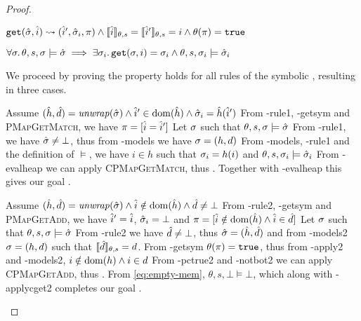 \begin{proof}


\pfassume \begin{hypvlist}
 $\texttt{get}(\hat{\sigma},\hat{i})\rightsquigarrow(\hat{i}', \hat{\sigma}_i, \pi) \land \llbracket\hat{i}\rrbracket_{\theta,s}=\llbracket\hat{i}'\rrbracket_{\theta,s}=i \land \theta(\pi)=\texttt{true} $
\end{hypvlist}
\pfprove \begin{goalvlist}
 $\forall \sigma\ldotp \theta,s,\sigma \models \hat{\sigma} \implies \exists \sigma_i \ldotp \texttt{get}(\sigma, i)=\sigma_i \land \theta,s,\sigma_i \models \hat{\sigma}_i$
\end{goalvlist}

We proceed by proving the property holds for all rules of the symbolic , resulting in three cases.


\begin{hypvlist}
 Assume $(\hat{h},\hat{d})={\operatorname{\mathit{unwrap}}}(\hat{\sigma}) \land \hat{i}'\in\operatorname{dom}(\hat{h}) \land \hat{\sigma}_i=\hat{h}(\hat{i}')$
 From \hyp{rule1}, \hyp{getsym} and \textsc{PMapGetMatch}, we have $\pi=[\hat{i}=\hat{i}']$
 Let $\sigma$ such that $\theta,s,\sigma\models\hat{\sigma}$
 From \hyp{rule1}, we have $\hat{\sigma}\neq\bot$, thus from \hyp{models} we have $\sigma=(h, d)$
 From \hyp{models}, \hyp{rule1} and the definition of $\models$, we have $i\in h$ such that $\sigma_i=h(i)$ and ${\theta,s,\sigma_i\models\hat{\sigma}_i}$
 From \hyp{evalheap} we can apply \textsc{CPMapGetMatch}, thus . Together with \hyp{evalheap} this gives our goal .
\end{hypvlist}


\begin{hypvlist}
 Assume $(\hat{h},\hat{d})={\operatorname{\mathit{unwrap}}}(\hat{\sigma}) \land \hat{i}\notin\operatorname{dom}(\hat{h}) \land \hat{d}\neq\bot$
 From \hyp{rule2}, \hyp{getsym} and \textsc{PMapGetAdd}, we have $\hat{i}'=\hat{i}$, $\hat{\sigma}_i=\bot$ and ${\pi=[\hat{i}\notin \operatorname{dom}(\hat{h})\land \hat{i} \in \hat{d}]}$%
 Let $\sigma$ such that $\theta,s,\sigma\models\hat{\sigma}$
 From \hyp{rule2} we have $\hat{d}\neq\bot$, thus $\hat{\sigma}=(\hat{h},\hat{d})$ and from \hyp{models2} $\sigma=(h,d)$ such that $\llbracket\hat{d}\rrbracket_{\theta,s} = d$.
 From \hyp{getsym} $\theta(\pi)=\texttt{true}$, thus from \hyp{apply2} and \hyp{models2}, $i\notin \operatorname{dom}(h) \land i\in d$
 From \hyp{pctrue2} and \hyp{notbot2} we can apply \textsc{CPMapGetAdd}, thus .
 From \ref{eq:empty-mem}, $\theta,s,\bot\models\bot$, which along with \hyp{applycget2} completes our goal .
\end{hypvlist}


\end{proof}
